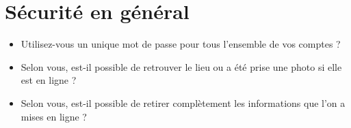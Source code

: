\documentclass[a4paper]{article}
\begin{document}
\begin{itemize}
\end{itemize}

\section{Sécurité en général}

\begin{itemize}
\item Utilisez-vous un unique mot de passe pour tous l'ensemble de vos comptes ?
  \begin{multicols}{2}
  \end{multicols}

\item Selon vous, est-il possible de retrouver le lieu ou a été prise une photo si elle est en ligne ?
  \begin{multicols}{2}
  \end{multicols}

\item Selon vous, est-il possible de retirer complètement les informations que l'on a mises en ligne ?
  \begin{multicols}{2}
  \end{multicols}

\end{itemize}
\end{document}
